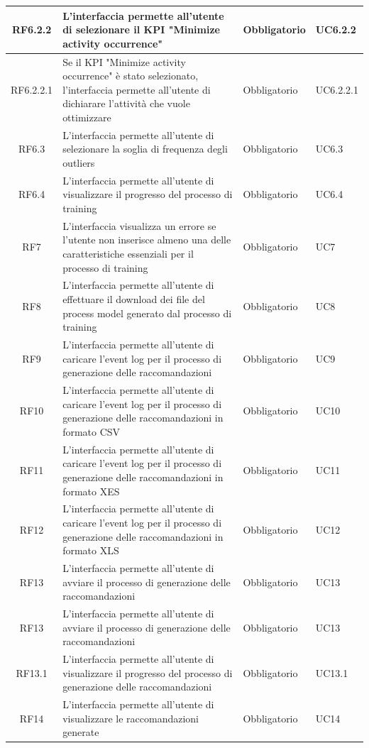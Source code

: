 \begin{longtable}{cp{8cm}ll}
\hline
RF6.2.2 & L'interfaccia permette all'utente di selezionare il KPI "Minimize activity occurrence" & Obbligatorio & UC6.2.2 \\
\hline
RF6.2.2.1 & Se il KPI "Minimize activity occurrence" è stato selezionato, l'interfaccia permette all'utente di dichiarare l'attività che vuole ottimizzare & Obbligatorio & UC6.2.2.1 \\
\hline
RF6.3 & L'interfaccia permette all'utente di selezionare la soglia di frequenza degli outliers & Obbligatorio & UC6.3 \\
\hline
RF6.4 & L'interfaccia permette all'utente di visualizzare il progresso del processo di training & Obbligatorio & UC6.4 \\
\hline
RF7 & L'interfaccia visualizza un errore se l'utente non inserisce almeno una delle caratteristiche essenziali per il processo di training & Obbligatorio & UC7 \\
\hline
RF8 & L'interfaccia permette all'utente di effettuare il download dei file del process model generato dal processo di training & Obbligatorio & UC8 \\
\hline
RF9 & L'interfaccia permette all'utente di caricare l'event log per il processo di generazione delle raccomandazioni & Obbligatorio & UC9 \\
\hline
RF10 & L'interfaccia permette all'utente di caricare l'event log per il processo di generazione delle raccomandazioni in formato CSV & Obbligatorio & UC10 \\
\hline
RF11 & L'interfaccia permette all'utente di caricare l'event log per il processo di generazione delle raccomandazioni in formato XES & Obbligatorio & UC11 \\
\hline
RF12 & L'interfaccia permette all'utente di caricare l'event log per il processo di generazione delle raccomandazioni in formato XLS & Obbligatorio & UC12 \\
\hline
RF13 & L'interfaccia permette all'utente di avviare il processo di generazione delle raccomandazioni & Obbligatorio & UC13 \\
\hline
RF13 & L'interfaccia permette all'utente di avviare il processo di generazione delle raccomandazioni & Obbligatorio & UC13 \\
\hline
RF13.1 & L'interfaccia permette all'utente di visualizzare il progresso del processo di generazione delle raccomandazioni & Obbligatorio & UC13.1 \\
\hline
RF14 & L'interfaccia permette all'utente di visualizzare le raccomandazioni generate & Obbligatorio & UC14 \\

\end{longtable}
